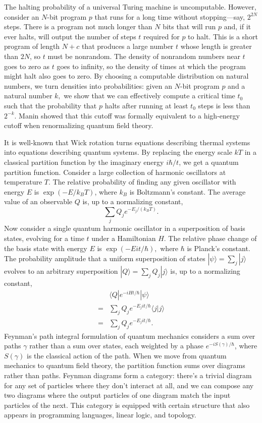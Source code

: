 \documentclass[12pt,twoside,openright]{report}
\begin{document}
The halting probability of a universal Turing machine is uncomputable.  However, consider an $N$-bit program $p$ that runs for a long time without stopping---say, $2^{2N}$ steps.  There is a program not much longer than $N$ bits that will run $p$ and, if it ever halts, will output the number of steps $t$ required for $p$ to halt.  This is a short program of length $N + c$ that produces a large number $t$ whose length is greater than $2N$, so $t$ must be nonrandom.  The density of nonrandom numbers near $t$ goes to zero as $t$ goes to infinity, so the density of times at which the program might halt also goes to zero.  By choosing a computable distribution on natural numbers, we turn densities into probabilities: given an $N$-bit program $p$ and a natural number $k,$ we show that we can effectively compute a critical time $t_0$ such that the probability that $p$ halts after running at least $t_0$ steps is less than $2^{-k}.$  Manin \cite{ManinRenorm2} showed that this cutoff was formally equivalent to a high-energy cutoff when renormalizing quantum field theory.

It is well-known that Wick rotation turns equations describing thermal systems into equations describing quantum systems.  By replacing the energy scale $kT$ in a classical partition function by the imaginary energy $i\hbar/t$, we get a quantum partition function.  Consider a large collection of harmonic oscillators at temperature $T$.  The relative probability of finding any given oscillator with energy $E$ is $\exp(-E/k_B T)$, where $k_B$ is Boltzmann's constant. The average value of an observable $Q$ is, up to a normalizing constant,
\[ \sum_j Q_j e^{-E_j / (k_B T)}.\]
Now consider a single quantum harmonic oscillator in a superposition of basis states, evolving for a time $t$ under a Hamiltonian $H$. The relative phase change of the basis state with energy $E$ is $\exp(-E it/ \hbar),$ where $\hbar$ is Planck's constant. The probability amplitude that a uniform superposition of states $|\psi\rangle = \sum_j |j\rangle$ evolves to an arbitrary superposition $|Q\rangle = \sum_j Q_j |j\rangle$ is, up to a normalizing constant,
\begin{align*}
   & \langle Q|e^{-iHt/\hbar}|\psi\rangle \\
  = & \sum_j Q_j e^{-E_j it/ \hbar}\langle j|j\rangle \\
  = & \sum_j Q_j e^{-E_j it/ \hbar}.
\end{align*}
Feynman's path integral formulation of quantum mechanics considers a sum over paths $\gamma$ rather than a sum over states, each weighted by a phase $e^{-iS(\gamma)/\hbar}$, where $S(\gamma)$ is the classical action of the path.  When we move from quantum mechanics to quantum field theory, the partition function sums over diagrams rather than paths.  Feynman diagrams form a category: there's a trivial diagram for any set of particles where they don't interact at all, and we can compose any two diagrams where the output particles of one diagram match the input particles of the next.  This category is equipped with certain structure that also appears in programming languages, linear logic, and topology.
\end{document}
